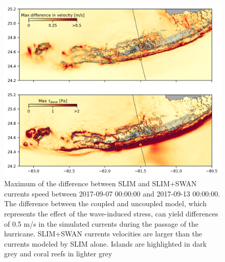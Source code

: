 \documentclass[11pt,a4paper]{article}
\begin{document}
\begin{figure}
    \centering
    \includegraphics[width=.95\textwidth]{fig/max_diff_reefs.png}
    \caption{Maximum of the difference between SLIM and SLIM+SWAN currents speed between 2017-09-07 00:00:00 and 2017-09-13 00:00:00. The difference between the coupled and uncoupled model, which represents the effect of the wave-induced stress, can yield differences of 0.5 m/s in the simulated currents during the passage of the hurricane. SLIM+SWAN currents velocities are larger than the currents modeled by SLIM alone. Islands are highlighted in dark grey and coral reefs in lighter grey}
    \label{fig:diff}
\end{figure}
\end{document}
